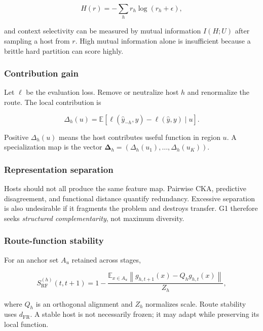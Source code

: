 \documentclass[11pt,a4paper]{article}
\newcommand{\E}{\mathbb{E}}
\newcommand{\norm}[1]{\left\lVert #1 \right\rVert}
\begin{document}
\begin{equation}
 H(r)=-\sum_h r_h\log(r_h+\epsilon),
\end{equation}

and context selectivity can be measured by mutual information \(I(H;U)\) after sampling a host from \(r\). High mutual information alone is insufficient because a brittle hard partition can score highly.

\subsubsection{Contribution gain}

Let \(\ell\) be the evaluation loss. Remove or neutralize host \(h\) and renormalize the route. The local contribution is

\begin{equation}
 \Delta_h(u)=\E[\ell(\hat y_{-h},y)-\ell(\hat y,y)\mid u].
\end{equation}

Positive \(\Delta_h(u)\) means the host contributes useful function in region \(u\). A specialization map is the vector \(\bm\Delta_h=(\Delta_h(u_1),\ldots,\Delta_h(u_K))\).

\subsubsection{Representation separation}

Hosts should not all produce the same feature map. Pairwise CKA, predictive disagreement, and functional distance quantify redundancy. Excessive separation is also undesirable if it fragments the problem and destroys transfer. G1 therefore seeks \emph{structured complementarity}, not maximum diversity.

\subsubsection{Route-function stability}

For an anchor set \(A_u\) retained across stages,

\begin{equation}
 S^{(h)}_{\mathrm{RF}}(t,t+1)=1-
 \frac{\E_{x\in A_u}\norm{g_{h,t+1}(x)-Q_hg_{h,t}(x)}}{Z_h},
\end{equation}

where \(Q_h\) is an orthogonal alignment and \(Z_h\) normalizes scale. Route stability uses \(d_{\mathrm{FR}}\). A stable host is not necessarily frozen; it may adapt while preserving its local function.
\end{document}
